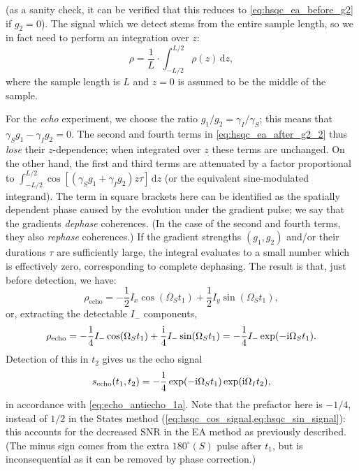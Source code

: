 (as a sanity check, it can be verified that this reduces to \cref{eq:hsqc_ea_before_g2} if $g_2 = 0$).
The signal which we detect stems from the entire sample length, so we in fact need to perform an integration over $z$:
\begin{equation}
    \label{eq:density_operator_integration}
    \rho = \frac{1}{L} \cdot \int_{-L/2}^{L/2} \rho(z) \,\mathrm{d}z,
\end{equation}
where the sample length is $L$ and $z=0$ is assumed to be the middle of the sample.

For the \textit{echo} experiment, we choose the ratio $g_1/g_2 = \gamma_I/\gamma_S$; this means that $\gamma_S g_1 - \gamma_I g_2 = 0$.
The second and fourth terms in \cref{eq:hsqc_ea_after_g2_2} thus \textit{lose} their $z$-dependence; when integrated over $z$ these terms are unchanged.
On the other hand, the first and third terms are attenuated by a factor proportional to $\int_{-L/2}^{L/2} \cos[(\gamma_S g_1 + \gamma_I g_2)z\tau]\,\mathrm{d}z$ (or the equivalent sine-modulated integrand).
The term in square brackets here can be identified as the spatially dependent phase caused by the evolution under the gradient pulse; we say that the gradients \textit{dephase} coherences. (In the case of the second and fourth terms, they also \textit{rephase} coherences.)
If the gradient strengths $(g_1, g_2)$ and/or their durations $\tau$ are sufficiently large, the integral evaluates to a small number which is effectively zero, corresponding to complete dephasing.
The result is that, just before detection, we have:
\begin{equation}
    \label{eq:hsqc_ea_echo_cartesian}
    \rho_\text{echo} = -\frac{1}{2}I_x\cos(\Omega_S t_1) + \frac{1}{2}I_y\sin(\Omega_S t_1),
\end{equation}
or, extracting the detectable $I_-$ components,
\begin{equation}
    \label{eq:hsqc_ea_echo_detectable}
    \rho_\text{echo} = -\frac{1}{4}I_-\cos(\Omega_S t_1) + \frac{\mathrm{i}}{4}I_-\sin(\Omega_S t_1) = -\frac{1}{4}I_-\exp(-\mathrm{i}\Omega_S t_1).
\end{equation}
Detection of this in $t_2$ gives us the echo signal
\begin{equation}
    \label{eq:hsqc_ea_echo_signal}
    s_\text{echo}(t_1, t_2) = -\frac{1}{4}\exp(-\mathrm{i} \Omega_S t_1)\exp(\mathrm{i} \Omega_I t_2),
\end{equation}
in accordance with \cref{eq:echo_antiecho_1a}.
Note that the prefactor here is $-1/4$, instead of $1/2$ in the States method (\cref{eq:hsqc_cos_signal,eq:hsqc_sin_signal}): this accounts for the decreased SNR in the EA method as previously described.
(The minus sign comes from the extra $180^\circ(S)$ pulse after $t_1$, but is inconsequential as it can be removed by phase correction.)

